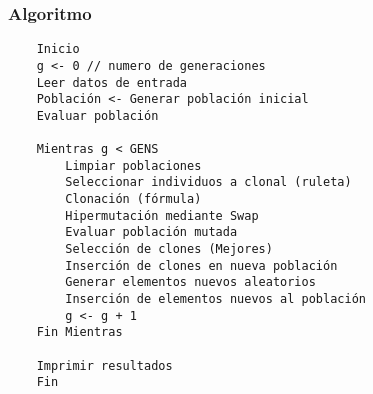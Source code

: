 \begin{frame}[fragile]
\frametitle{Algoritmo}
\tiny
\begin{verbatim}
    Inicio
    g <- 0 // numero de generaciones
    Leer datos de entrada
    Población <- Generar población inicial
    Evaluar población

    Mientras g < GENS
        Limpiar poblaciones
        Seleccionar individuos a clonal (ruleta)
        Clonación (fórmula)
        Hipermutación mediante Swap
        Evaluar población mutada
        Selección de clones (Mejores)
        Inserción de clones en nueva población
        Generar elementos nuevos aleatorios
        Inserción de elementos nuevos al población
        g <- g + 1
    Fin Mientras

    Imprimir resultados
    Fin
\end{verbatim}
\end{frame}
